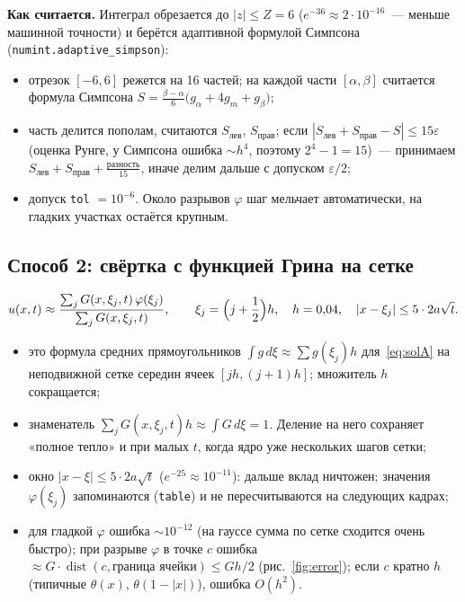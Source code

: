 \documentclass[a4paper,12pt]{article}
\newcommand{\code}[1]{\texttt{#1}}
\begin{document}
\textbf{Как считается.} Интеграл обрезается до $|z|\le Z=6$ ($e^{-36}\approx
2\cdot10^{-16}$~--- меньше машинной точности) и берётся адаптивной формулой
Симпсона (\code{numint.adaptive\_simpson}):
\begin{itemize}
  \item отрезок $[-6,6]$ режется на 16 частей; на каждой части $[\alpha,\beta]$
        считается формула Симпсона $S=\frac{\beta-\alpha}{6}\bigl(g_\alpha+4g_m+g_\beta\bigr)$;
  \item часть делится пополам, считаются $S_{\text{лев}}$, $S_{\text{прав}}$;
        если $|S_{\text{лев}}+S_{\text{прав}}-S|\le15\varepsilon$ (оценка Рунге, у Симпсона
        ошибка $\sim h^4$, поэтому $2^4-1=15$)~--- принимаем $S_{\text{лев}}+S_{\text{прав}}+\frac{\text{разность}}{15}$,
        иначе делим дальше с допуском $\varepsilon/2$;
  \item допуск \code{tol} $=10^{-6}$. Около разрывов $\varphi$ шаг мельчает
        автоматически, на гладких участках остаётся крупным.
\end{itemize}

\subsection{Способ 2: свёртка с функцией Грина на сетке}
\begin{equation}\label{eq:greengrid}
  u(x,t)\approx\frac{\sum_j G(x,\xi_j,t)\,\varphi(\xi_j)}{\sum_j G(x,\xi_j,t)},\qquad
  \xi_j=\Bigl(j+\frac12\Bigr)h,\quad h=0{,}04,\quad |x-\xi_j|\le5\cdot2a\sqrt t .
\end{equation}
\begin{itemize}
  \item это формула средних прямоугольников $\int g\,d\xi\approx\sum g(\xi_j)h$
        для~\eqref{eq:solA} на неподвижной сетке середин ячеек $[jh,(j+1)h]$;
        множитель $h$ сокращается;
  \item знаменатель $\sum_jG(x,\xi_j,t)h\approx\int G\,d\xi=1$. Деление на него
        сохраняет «полное тепло» и при малых $t$, когда ядро уже нескольких шагов сетки;
  \item окно $|x-\xi|\le5\cdot2a\sqrt t$ ($e^{-25}\approx10^{-11}$): дальше
        вклад ничтожен; значения $\varphi(\xi_j)$ запоминаются (\code{table}) и
        не пересчитываются на следующих кадрах;
  \item для гладкой $\varphi$ ошибка $\sim10^{-12}$ (на гауссе сумма по сетке
        сходится очень быстро); при разрыве $\varphi$ в точке $c$ ошибка
        $\approx G\cdot\operatorname{dist}(c,\text{граница ячейки})\le G h/2$
        (рис.~\ref{fig:error}); если $c$ кратно $h$ (типичные $\theta(x)$,
        $\theta(1-|x|)$), ошибка $O(h^2)$.
\end{itemize}
\end{document}
